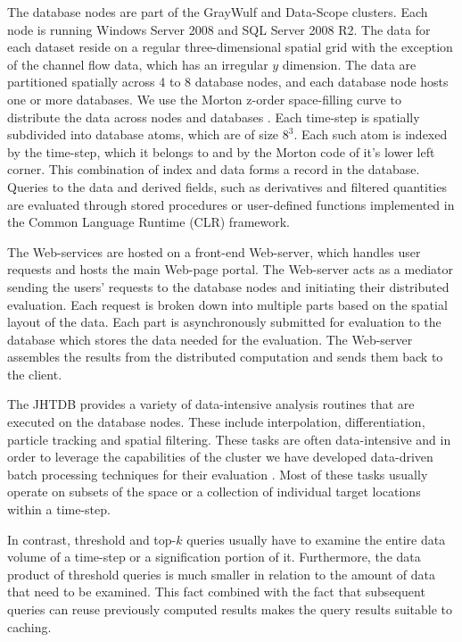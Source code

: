 \documentclass{sig-alternate}
\begin{document}
The database nodes are part of the GrayWulf \cite{Szalay} and Data-Scope \cite{DataScope} clusters. Each node
is running Windows Server 2008 and SQL Server 2008 R2. The data for each dataset reside on a regular three-dimensional spatial grid with the
exception of the channel flow data, which has an irregular $y$ dimension. The data are partitioned spatially across 4 to 8
database nodes, and each database node hosts one or more databases. We use the Morton z-order space-filling
curve to distribute the data across nodes and databases \cite{Perlman}. Each time-step is spatially subdivided
into database atoms, which are of size $8^3$. Each such atom is indexed by the time-step, which it belongs to and
by the Morton code of it's lower left corner. This combination of index and data forms a record in the database.
Queries to the data and derived fields, such as derivatives and filtered quantities are evaluated through
stored procedures or user-defined functions implemented in the Common Language Runtime (CLR) framework.

The Web-services are hosted on a front-end Web-server, which handles user requests and hosts the main Web-page portal.
The Web-server acts as a mediator sending the users' requests to the database nodes and initiating their distributed evaluation. 
Each request is broken down into multiple parts based on the spatial layout of the data. Each part is asynchronously submitted for evaluation 
to the database which stores the data needed for the evaluation.
The Web-server assembles the results from the distributed computation and sends them back to the client.

The JHTDB provides a variety of data-intensive analysis routines that are executed on the database nodes. These include interpolation, 
differentiation, particle tracking and spatial filtering. These tasks are often data-intensive and in order to leverage the capabilities of the cluster we
have developed data-driven batch processing techniques for their evaluation \cite{KanovSC11, KanovSC12}. Most of these tasks usually operate on subsets
of the space or a collection of individual target locations within a time-step. 

In contrast, threshold and top-$k$ queries usually have to examine the entire 
data volume of a time-step or a signification portion of it. Furthermore, the data product of threshold queries is much smaller in relation to the amount of 
data that need to be examined. This fact combined with the fact that subsequent queries can reuse 
previously computed results makes the query results suitable to caching. 
\end{document}
